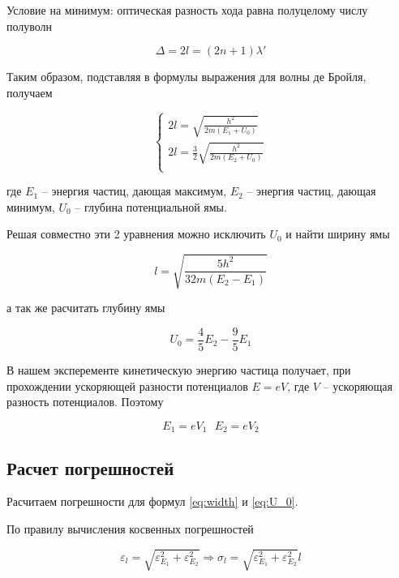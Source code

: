     Условие на минимум: оптическая разность хода равна полуцелому числу полуволн

    \begin{equation}
        \Delta = 2l = (2n + 1) \lambda'
    \end{equation}

    Таким образом, подставляя в формулы выражения для волны де Бройля, получаем

    \begin{equation}
        \begin{cases}
            2l = \sqrt{\frac{h^2}{2m (E_1 + U_0)}} \\
            2l = \frac{3}{2} \sqrt{\frac{h^2}{2m (E_2 + U_0)}} \\
        \end{cases}
    \end{equation}

    где $E_1$ -- энергия частиц, дающая максимум, $E_2$ -- энергия частиц, дающая минимум, $U_0$ -- глубина потенциальной ямы.

    Решая совместно эти 2 уравнения можно исключить $U_0$ и найти ширину ямы

    \begin{equation} \label{eq:width}
        l = \sqrt{\frac{5 h^2}{32 m (E_2 - E_1)}}
    \end{equation}

    а так же расчитать глубину ямы

    \begin{equation} \label{eq:U_0}
        U_0 = \frac{4}{5}E_2 - \frac{9}{5}E_1
    \end{equation}

    В нашем эксперементе кинетическую энергию частица получает, при прохождении ускоряющей разности потенциалов $E = e V$, 
    где $V$ -- ускоряющая разность потенциалов. Поэтому

    \[ E_1 = e V_1 ~~~ E_2 = e V_2 \]

    \subsection*{Расчет погрешностей}

    Расчитаем погрешности для формул \eqref{eq:width} и \eqref{eq:U_0}.

    По правилу вычисления косвенных погрешностей

    \begin{equation}
        \varepsilon_l = \sqrt{\varepsilon_{E_1}^2 + \varepsilon_{E_2}^2} \Rightarrow \sigma_l = \sqrt{\varepsilon_{E_1}^2 + \varepsilon_{E_2}^2} l
    \end{equation}

